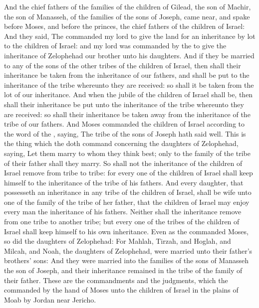 \begin{biblechapter} %
 And the chief fathers of the families of the children of Gilead, the son of Machir, the son of Manasseh, of the families of the sons of Joseph, came near, and spake before Moses, and before the princes, the chief fathers of the children of Israel:
\verse And they said, The \LORD commanded my lord to give the land for an inheritance by lot to the children of Israel: and my lord was commanded by the \LORD to give the inheritance of Zelophehad our brother unto his daughters.
\verse And if they be married to any of the sons of the other tribes of the children of Israel, then shall their inheritance be taken from the inheritance of our fathers, and shall be put to the inheritance of the tribe whereunto they are received: so shall it be taken from the lot of our inheritance.
\verse And when the jubile of the children of Israel shall be, then shall their inheritance be put unto the inheritance of the tribe whereunto they are received: so shall their inheritance be taken away from the inheritance of the tribe of our fathers.
\verse And Moses commanded the children of Israel according to the word of the \LORD, saying, The tribe of the sons of Joseph hath said well.
\verse This is the thing which the \LORD doth command concerning the daughters of Zelophehad, saying, Let them marry to whom they think best; only to the family of the tribe of their father shall they marry.
\verse So shall not the inheritance of the children of Israel remove from tribe to tribe: for every one of the children of Israel shall keep himself to the inheritance of the tribe of his fathers.
\verse And every daughter, that possesseth an inheritance in any tribe of the children of Israel, shall be wife unto one of the family of the tribe of her father, that the children of Israel may enjoy every man the inheritance of his fathers.
\verse Neither shall the inheritance remove from one tribe to another tribe; but every one of the tribes of the children of Israel shall keep himself to his own inheritance.
\verse Even as the \LORD commanded Moses, so did the daughters of Zelophehad:
\verse For Mahlah, Tirzah, and Hoglah, and Milcah, and Noah, the daughters of Zelophehad, were married unto their father's brothers' sons:
\verse And they were married into the families of the sons of Manasseh the son of Joseph, and their inheritance remained in the tribe of the family of their father.
\verse These are the commandments and the judgments, which the \LORD commanded by the hand of Moses unto the children of Israel in the plains of Moab by Jordan near Jericho.
\end{biblechapter}
